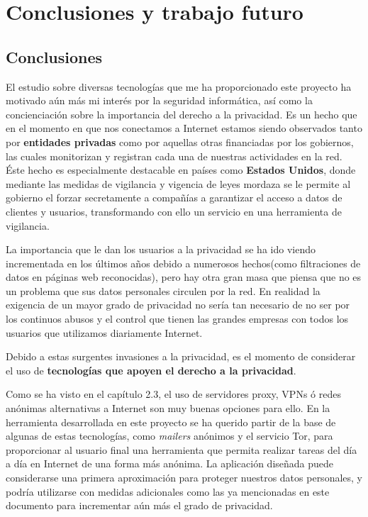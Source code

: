 \chapter{Conclusiones y trabajo futuro}
\label{chap:conclusiones}
\section{Conclusiones}
El estudio sobre diversas tecnologías que me ha proporcionado este proyecto ha motivado aún más mi interés por la seguridad informática, así como la concienciación sobre la importancia del derecho a la privacidad.
Es un hecho que en el momento en que nos conectamos a Internet estamos siendo observados tanto por \textbf{entidades privadas} como por aquellas otras financiadas por los gobiernos, las cuales monitorizan y registran cada una de nuestras actividades en la red. Éste hecho es especialmente destacable en países como \textbf{Estados Unidos}, donde mediante las medidas de vigilancia y vigencia de leyes mordaza se le permite al gobierno el forzar secretamente a compañías a garantizar el acceso a datos de clientes y usuarios, transformando con ello un servicio en una herramienta de vigilancia. 

La importancia que le dan los usuarios a la privacidad se ha ido viendo incrementada en los últimos años debido a numerosos hechos(como filtraciones de datos en páginas web reconocidas), pero hay otra gran masa que piensa que no es un problema que sus datos personales circulen por la red. 
En realidad la exigencia de un mayor grado de privacidad no sería tan necesario de no ser por los continuos abusos y el control que tienen las grandes empresas con todos los usuarios que utilizamos diariamente Internet.

Debido a estas surgentes invasiones a la privacidad, es el momento de considerar el uso de \textbf{tecnologías que apoyen el derecho a la privacidad}. 

Como se ha visto en el capítulo 2.3, el uso de servidores proxy, VPNs ó redes anónimas alternativas a Internet son muy buenas opciones para ello. En la herramienta desarrollada en este proyecto se ha querido partir de la base de algunas de estas tecnologías, como \textit{mailers }anónimos y el servicio Tor, para proporcionar al usuario final una herramienta que permita realizar tareas del día a día en Internet de una forma más anónima. 
La aplicación diseñada puede considerarse una primera aproximación para proteger nuestros datos personales, y podría utilizarse con medidas adicionales como las ya mencionadas en este documento para incrementar aún más el grado de privacidad.

